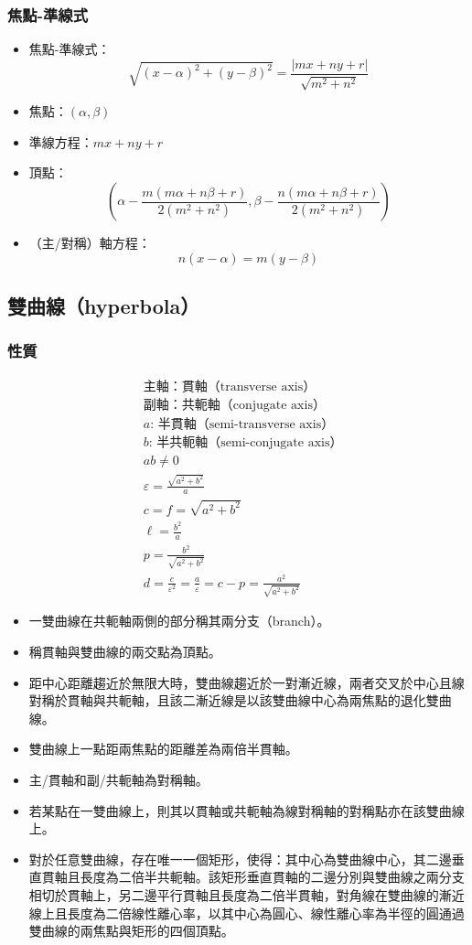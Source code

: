 \documentclass[a4paper,12pt]{report}
\begin{document}
\subsubsection{焦點-準線式}
\begin{itemize}
\item 焦點-準線式：
\[\sqrt{(x-\alpha)^2+(y-\beta)^2}=\frac{|mx+ny+r|}{\sqrt{m^2+n^2}}\]
\item 焦點：$(\alpha,\beta)$
\item 準線方程：$mx+ny+r$
\item 頂點：
\[\left( \alpha - \frac{m(m\alpha + n\beta + r)}{2(m^2+n^2)}, \beta - \frac{n(m\alpha + n\beta + r)}{2(m^2+n^2)} \right)\]
\item （主/對稱）軸方程：
\[n(x-\alpha)=m(y-\beta)\]
\end{itemize}
\subsection{雙曲線（hyperbola）}
\subsubsection{性質}
\[\begin{aligned}
&\text{主軸：貫軸（transverse axis）}\\
&\text{副軸：共軛軸（conjugate axis）}\\
&a:\,\text{半貫軸（semi-transverse axis）}\\
&b:\,\text{半共軛軸（semi-conjugate axis）}\\
&ab\neq 0\\
&\varepsilon=\frac{\sqrt{a^2+b^2}}{a}\\
&c=f=\sqrt{a^2+b^2}\\
&\ell=\frac{b^2}{a}\\
&p=\frac{b^2}{\sqrt{a^2+b^2}}\\
&d=\frac{c}{\varepsilon^2}=\frac{a}{\varepsilon}=c-p=\frac{a^2}{\sqrt{a^2+b^2}}
\end{aligned}\]
\begin{itemize}
\item 一雙曲線在共軛軸兩側的部分稱其兩分支（branch）。
\item 稱貫軸與雙曲線的兩交點為頂點。
\item 距中心距離趨近於無限大時，雙曲線趨近於一對漸近線，兩者交叉於中心且線對稱於貫軸與共軛軸，且該二漸近線是以該雙曲線中心為兩焦點的退化雙曲線。
\item 雙曲線上一點距兩焦點的距離差為兩倍半貫軸。
\item 主/貫軸和副/共軛軸為對稱軸。
\item 若某點在一雙曲線上，則其以貫軸或共軛軸為線對稱軸的對稱點亦在該雙曲線上。
\item 對於任意雙曲線，存在唯一一個矩形，使得：其中心為雙曲線中心，其二邊垂直貫軸且長度為二倍半共軛軸。該矩形垂直貫軸的二邊分別與雙曲線之兩分支相切於貫軸上，另二邊平行貫軸且長度為二倍半貫軸，對角線在雙曲線的漸近線上且長度為二倍線性離心率，以其中心為圓心、線性離心率為半徑的圓通過雙曲線的兩焦點與矩形的四個頂點。
\end{itemize}
\end{document}
